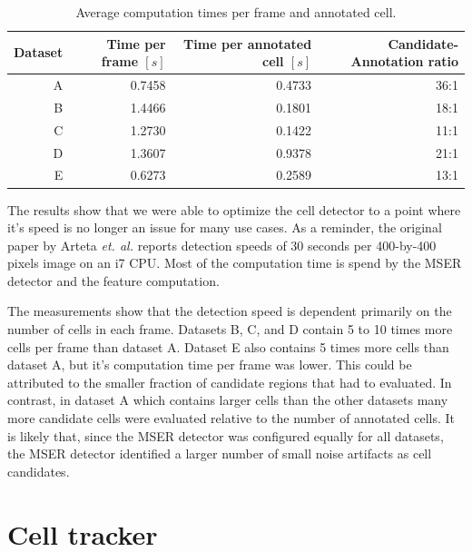 		\begin{table}[h]
			\centering
			\begin{tabular}{rrrr}
				Dataset & Time per frame  $\left[ s \right]$ & Time per annotated cell  $\left[ s \right]$ & Candidate-Annotation ratio \\
			\hline
				      A &                             0.7458 &                                      0.4733 &                       36:1 \\
				      B &                             1.4466 &                                      0.1801 &                       18:1 \\
				      C &                             1.2730 &                                      0.1422 &                       11:1 \\
				      D &                             1.3607 &                                      0.9378 &                       21:1 \\
				      E &                             0.6273 &                                      0.2589 &                       13:1
			\end{tabular} 
			\caption{Average computation times per frame and annotated cell.}
			\label{tab:results_detector_speed}
		\end{table}

		The results show that we were able to optimize the cell detector to a point where it's speed is no longer an issue for many use cases. As a reminder, the original paper by Arteta \emph{et. al.} \cite{arteta12} reports detection speeds of 30 seconds per 400-by-400 pixels image on an i7 CPU. Most of the computation time is spend by the MSER detector and the feature computation.
		
		The measurements show that the detection speed is dependent primarily on the number of cells in each frame. Datasets B, C, and D contain 5 to 10 times more cells per frame than dataset A. Dataset E also contains 5 times more cells than dataset A, but it's computation time per frame was lower. This could be attributed to the smaller fraction of candidate regions that had to evaluated. In contrast, in dataset A which contains larger cells than the other datasets many more candidate cells were evaluated relative to the number of annotated cells. It is likely that, since the MSER detector was configured equally for all datasets, the MSER detector identified a larger number of small noise artifacts as cell candidates.
		
\section{Cell tracker}
	\label{sec:results_tracker}
	

